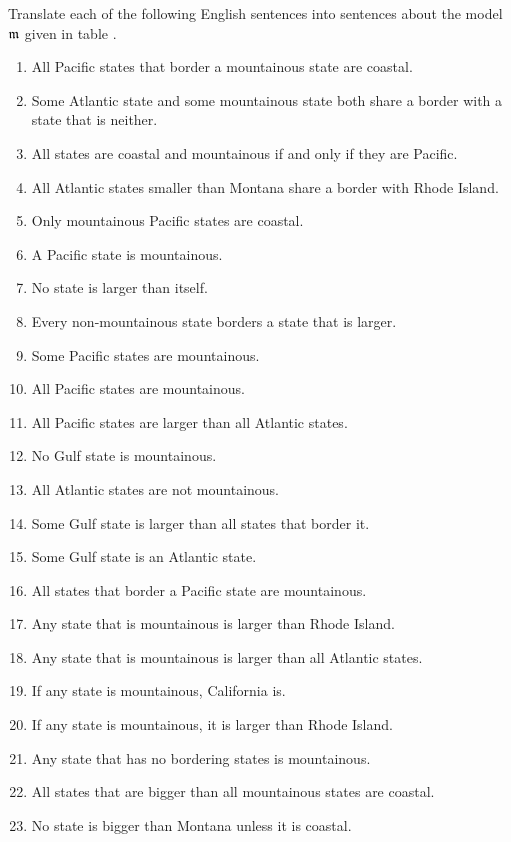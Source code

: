  Translate each of the following English sentences into \GQL{} sentences about the model $\mathfrak{m}$ given in table .
\begin{multicols}{2}
	\begin{enumerate}
		\item {All Pacific states that border a mountainous state are coastal.}
		\item {Some Atlantic state and some mountainous state both share a border with a state that is neither.}
		\item {All states are coastal and mountainous if and only if they are Pacific.}
		\item {All Atlantic states smaller than Montana share a border with Rhode Island.}
		\item {Only mountainous Pacific states are coastal.}
		\item {A Pacific state is mountainous.}
		\item {No state is larger than itself.}
		\item {Every non-mountainous state borders a state that is larger.}
		\item {Some Pacific states are mountainous.}
		\item {All Pacific states are mountainous.}
		\item {All Pacific states are larger than all Atlantic states.}
		\item {No Gulf state is mountainous.}
		\item {All Atlantic states are not mountainous.}
		\item {Some Gulf state is larger than all states that border it.}
		\item {Some Gulf state is an Atlantic state.}
		\item {All states that border a Pacific state are mountainous.}
		\item {Any state that is mountainous is larger than Rhode Island.}
		\item {Any state that is mountainous is larger than all Atlantic
			states.}
		\item {If any state is mountainous, California is.}
		\item {If any state is mountainous, it is larger than Rhode Island.}
		\item {Any state that has no bordering states is mountainous.}
		\item {All states that are bigger than all mountainous states are
			coastal.}
		\item {No state is bigger than Montana unless it is coastal.}
	\end{enumerate}
\end{multicols}
